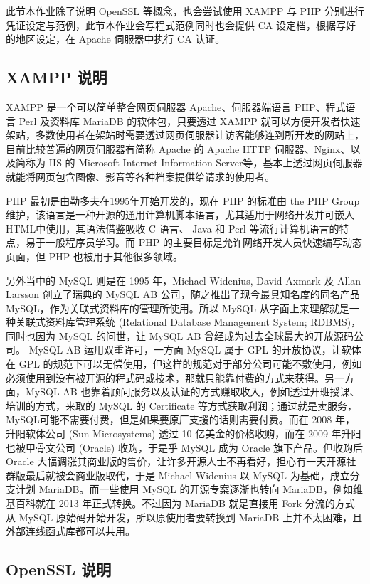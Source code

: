 此节本作业除了说明 OpenSSL 等概念，也会尝试使用 XAMPP 与 PHP 分别进行凭证设定与范例，此节本作业会写程式范例同时也会提供 CA 设定档，根据写好的地区设定，在 Apache 伺服器中执行 CA 认证。

\subsection{XAMPP 说明}

XAMPP 是一个可以简单整合网页伺服器 Apache、伺服器端语言 PHP、程式语言 Perl 及资料库 MariaDB 的软体包，只要透过 XAMPP 就可以方便开发者快速架站，多数使用者在架站时需要透过网页伺服器让访客能够连到所开发的网站上，目前比较普遍的网页伺服器有简称 Apache 的 Apache HTTP 伺服器、Nginx、以及简称为 IIS 的 Microsoft Internet Information Server等，基本上透过网页伺服器就能将网页包含图像、影音等各种档案提供给请求的使用者。

PHP 最初是由勒多夫在1995年开始开发的，现在 PHP 的标准由 the PHP Group 维护，该语言是一种开源的通用计算机脚本语言，尤其适用于网络开发并可嵌入HTML中使用，其语法借鉴吸收 C 语言、 Java 和 Perl 等流行计算机语言的特点，易于一般程序员学习。而 PHP 的主要目标是允许网络开发人员快速编写动态页面，但 PHP 也被用于其他很多领域。

另外当中的 MySQL 则是在 1995 年，Michael Widenius, David Axmark 及 Allan Larsson 创立了瑞典的 MySQL AB 公司，随之推出了现今最具知名度的同名产品 MySQL，作为关联式资料库的管理所使用。所以 MySQL 从字面上来理解就是一种关联式资料库管理系统 (Relational Database Management System; RDBMS)，同时也因为 MySQL 的问世，让 MySQL AB 曾经成为过去全球最大的开放源码公司。
MySQL AB 运用双重许可，一方面 MySQL 属于 GPL 的开放协议，让软体在 GPL 的规范下可以无偿使用，但这样的规范对于部分公司可能不敷使用，例如必须使用到没有被开源的程式码或技术，那就只能靠付费的方式来获得。另一方面，MySQL AB 也靠着顾问服务以及认证的方式赚取收入，例如透过开班授课、培训的方式，来取的 MySQL 的 Certificate 等方式获取利润；通过就是卖服务，MySQL可能不需要付费，但是如果要原厂支援的话则需要付费。而在 2008 年，升阳软体公司 (Sun Microsystems) 透过 10 亿美金的价格收购，而在 2009 年升阳也被甲骨文公司 (Oracle) 收购，于是乎 MySQL 成为 Oracle 旗下产品。但收购后 Oracle 大幅调涨其商业版的售价，让许多开源人士不再看好，担心有一天开源社群版最后就被会商业版取代，于是 Michael Widenius 以 MySQL 为基础，成立分支计划 MariaDB。而一些使用 MySQL 的开源专案逐渐也转向 MariaDB，例如维基百科就在 2013 年正式转换。不过因为 MariaDB 就是直接用 Fork 分流的方式从 MySQL 原始码开始开发，所以原使用者要转换到 MariaDB 上并不太困难，且外部连线函式库都可以共用。

\subsection{OpenSSL 说明}

